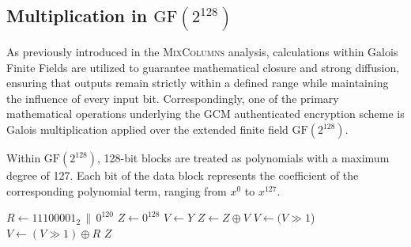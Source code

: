 \documentclass[11pt,a4paper]{report}
\begin{document}
\subsection{Multiplication in \texorpdfstring{$\mathrm{GF}(2^{128})$}{GF(2\textasciicircum 128)}}
As previously introduced in the \textsc{MixColumns} analysis, calculations within Galois Finite Fields are utilized to guarantee mathematical closure and strong diffusion, 
ensuring that outputs remain strictly within a defined range while maintaining the influence of every input bit. 
Correspondingly, one of the primary mathematical operations underlying the GCM authenticated encryption scheme is Galois multiplication applied over the extended finite field $\mathrm{GF}(2^{128})$.

Within $\mathrm{GF}(2^{128})$, 128-bit blocks are treated as polynomials with a maximum degree of 127. 
Each bit of the data block represents the coefficient of the corresponding polynomial term, ranging from $x^0$ to $x^{127}$.

\begin{algorithm}[htbp]
\caption{Multiplication in $\mathrm{GF}(2^{128})$: $X \bullet Y$}
\label{alg:gf128_mult}
\begin{algorithmic}[1]
    \State $R \gets 11100001_2 \,\|\, 0^{120}$
    \State $Z \gets 0^{128}$
    \State $V \gets Y$
         
            \State $Z \gets Z \oplus V$
        \EndIf
            \State $V \gets (V \gg 1$)
        \Else
            \State $V \gets (V \gg 1) \oplus R$
        \EndIf
    \EndFor
    \State \Return $Z$
\EndProcedure
\end{algorithmic}
\end{algorithm}
\end{document}
